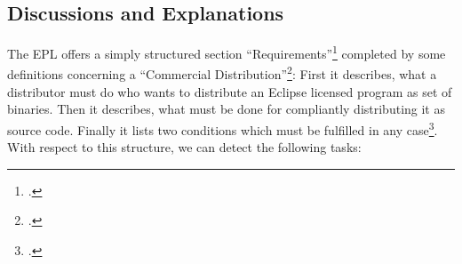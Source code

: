 \subsection{Discussions and Explanations}

The EPL offers a simply structured section
\enquote{Requirements}\footcite[cf.][\nopage wp\ §3]{Epl10OsiLicense2005a}
completed by some definitions concerning a \enquote{Commercial
Distribution}\footcite[cf.][\nopage wp\ §4]{Epl10OsiLicense2005a}: First it
describes, what a distributor must do who wants to distribute an Eclipse
licensed program as set of binaries. Then it describes, what must be done for
compliantly distributing it as source code. Finally it lists two conditions
which must be fulfilled in any case\footcite[cf.][\nopage wp\
§3]{Epl10OsiLicense2005a}. With respect to this structure, we can detect the
following tasks:

